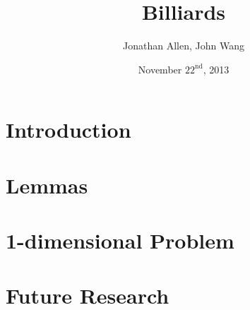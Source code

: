 \documentclass{beamer}
\title{Billiards}
\author{Jonathan Allen, John Wang}
\institute[MIT]{Massachusetts Institute of Technology}
\date{November $22^\text{nd}$, 2013}
\begin{document}
\graphicspath{ {figures/} }

\frame{

\titlepage

}

\section{Introduction}



\section{Lemmas}

\frame{
  \tableofcontents[currentsection]
}



\section{1-dimensional Problem}

\frame{
  \tableofcontents[currentsection]
}



\section{Future Research}

\frame{
  \tableofcontents[currentsection]
}


\end{document}
